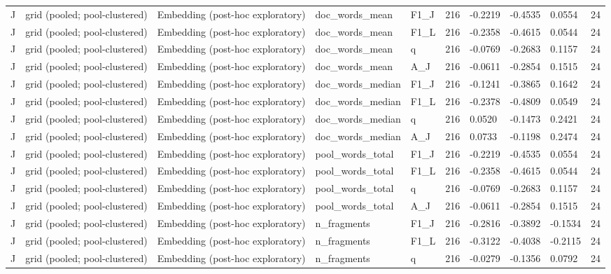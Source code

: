 \begin{table}[t]
{\begin{tabular}{llllllllll}
J & grid (pooled; pool-clustered) & Embedding (post-hoc exploratory) & doc\_words\_mean & F1\_J & 216 & -0.2219 & -0.4535 & 0.0554 & 24 \\
J & grid (pooled; pool-clustered) & Embedding (post-hoc exploratory) & doc\_words\_mean & F1\_L & 216 & -0.2358 & -0.4615 & 0.0544 & 24 \\
J & grid (pooled; pool-clustered) & Embedding (post-hoc exploratory) & doc\_words\_mean & q & 216 & -0.0769 & -0.2683 & 0.1157 & 24 \\
J & grid (pooled; pool-clustered) & Embedding (post-hoc exploratory) & doc\_words\_mean & A\_J & 216 & -0.0611 & -0.2854 & 0.1515 & 24 \\
J & grid (pooled; pool-clustered) & Embedding (post-hoc exploratory) & doc\_words\_median & F1\_J & 216 & -0.1241 & -0.3865 & 0.1642 & 24 \\
J & grid (pooled; pool-clustered) & Embedding (post-hoc exploratory) & doc\_words\_median & F1\_L & 216 & -0.2378 & -0.4809 & 0.0549 & 24 \\
J & grid (pooled; pool-clustered) & Embedding (post-hoc exploratory) & doc\_words\_median & q & 216 & 0.0520 & -0.1473 & 0.2421 & 24 \\
J & grid (pooled; pool-clustered) & Embedding (post-hoc exploratory) & doc\_words\_median & A\_J & 216 & 0.0733 & -0.1198 & 0.2474 & 24 \\
J & grid (pooled; pool-clustered) & Embedding (post-hoc exploratory) & pool\_words\_total & F1\_J & 216 & -0.2219 & -0.4535 & 0.0554 & 24 \\
J & grid (pooled; pool-clustered) & Embedding (post-hoc exploratory) & pool\_words\_total & F1\_L & 216 & -0.2358 & -0.4615 & 0.0544 & 24 \\
J & grid (pooled; pool-clustered) & Embedding (post-hoc exploratory) & pool\_words\_total & q & 216 & -0.0769 & -0.2683 & 0.1157 & 24 \\
J & grid (pooled; pool-clustered) & Embedding (post-hoc exploratory) & pool\_words\_total & A\_J & 216 & -0.0611 & -0.2854 & 0.1515 & 24 \\
J & grid (pooled; pool-clustered) & Embedding (post-hoc exploratory) & n\_fragments & F1\_J & 216 & -0.2816 & -0.3892 & -0.1534 & 24 \\
J & grid (pooled; pool-clustered) & Embedding (post-hoc exploratory) & n\_fragments & F1\_L & 216 & -0.3122 & -0.4038 & -0.2115 & 24 \\
J & grid (pooled; pool-clustered) & Embedding (post-hoc exploratory) & n\_fragments & q & 216 & -0.0279 & -0.1356 & 0.0792 & 24 \\

\end{tabular}}
\end{table}
